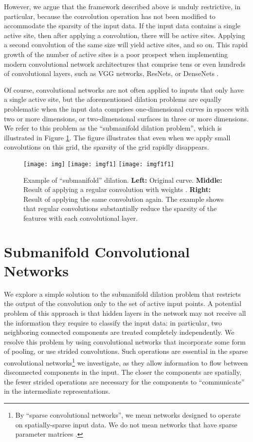 \documentclass[10pt,twocolumn,letterpaper]{article}
\begin{document}
However, we argue that the framework described above is unduly restrictive, in particular, because the convolution
operation has not been modified to accommodate the sparsity
of the input data. If the input data contains a single active site, then
after applying a  convolution, there will be  active
sites. Applying a second convolution of the same size will yield  active sites,
and so on. This rapid growth of the number of active sites is a poor prospect when implementing
modern convolutional network architectures that comprise tens or even hundreds of convolutional layers, such as VGG networks, ResNets, or DenseNets \cite{ResNet,DenseNet,journals/corr/SimonyanZ14a}.

Of course, convolutional networks are not often applied to inputs that only have a single active site, but the aforementioned dilation problems are equally problematic when the input data comprises one-dimensional
curves in spaces with two or more dimensions, or two-dimensional surfaces in three or more dimensions. We refer to this problem as the ``submanifold dilation problem'', which is illustrated in Figure \ref{6pics}. The figure illustrates that even when we apply small  convolutions on this grid, the sparsity of the grid rapidly disappears.

\begin{figure}
\begin{centering}
\texttt{[image: img]}
\texttt{[image: imgf1]}
\texttt{[image: imgf1f1]}
\caption{Example of ``submanifold'' dilation. \textbf{Left:} Original curve. \textbf{Middle:} Result of applying a regular  convolution with weights . \textbf{Right:} Result of applying the same convolution again. The example shows that regular convolutions substantially reduce the sparsity of the features with each convolutional layer.}\label{6pics}
\end{centering}
\end{figure}
 \section{Submanifold Convolutional Networks}
We explore a simple solution to the submanifold dilation problem that restricts the output of the convolution only to the set of
active input points. A potential problem of this approach is that hidden layers in the network may not receive all the information they require to classify the input data: in particular, two neighboring connected components are treated
completely independently. We resolve this problem by using convolutional networks that incorporate
some form of pooling, or use strided convolutions. Such operations are essential in the sparse convolutional networks\footnote{By ``sparse convolutional networks'', we mean networks designed to operate on spatially-sparse input data. We do not mean networks that have sparse parameter matrices \cite{braindamage,liupensky}.} we investigate, as they allow
information to flow between disconnected components in the input. The closer the components are spatially, the fewer strided operations are necessary for the components to ``communicate'' in the intermediate representations.
\end{document}
